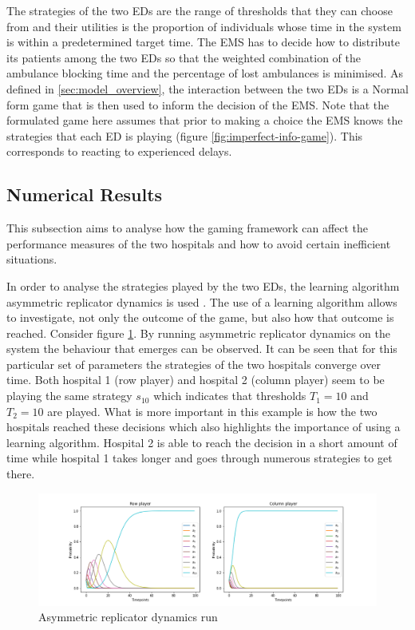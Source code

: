 The strategies of the two EDs are the range of thresholds that they can choose
from and their utilities is the proportion of individuals whose time in the 
system is within a predetermined target time.
The EMS has to decide how to distribute its patients among the two EDs so that 
the weighted combination of the ambulance blocking time and the percentage of 
lost ambulances is minimised. 
As defined in \ref{sec:model_overview}, the interaction between the two EDs 
is a Normal form game that is then used to inform the decision of the EMS.
Note that the formulated game here assumes that prior to making a choice the 
EMS knows the strategies that each ED is playing (figure 
\ref{fig:imperfect-info-game}). This corresponds to reacting to experienced delays.

\subsection{Numerical Results}

This subsection aims to analyse how the gaming framework can affect the 
performance measures of the two hospitals and how to avoid certain inefficient 
situations.

In order to analyse the strategies played by the two EDs, the learning algorithm
asymmetric replicator dynamics is used \cite{asymmetricreplicatordynamics}.
The use of a learning algorithm allows to investigate, not only the outcome of 
the game, but also how that outcome is reached.
Consider figure \ref{fig:ard-by-itself}. 
By running asymmetric replicator dynamics on the system the behaviour that 
emerges can be observed.
It can be seen that for this particular set of parameters the strategies of 
the two hospitals converge over time. 
Both hospital 1 (row player) and hospital 2 (column player) seem to be playing 
the same strategy \(s_10\) which indicates that thresholds \(T_1 = 10\) and 
\(T_2 = 10\) are played.
What is more important in this example is how the two hospitals reached these
decisions which also highlights the importance of using a learning algorithm.
Hospital 2 is able to reach the decision in a short amount of time while 
hospital 1 takes longer and goes through numerous strategies to get there.

\begin{figure}[H]
    \centering
    \includegraphics[scale=0.4, trim=120 0 120 0]{imgs/asymmetric_rd/asymmetric_rd.png}
    \caption{Asymmetric replicator dynamics run}
    \label{fig:ard-by-itself}
\end{figure}



